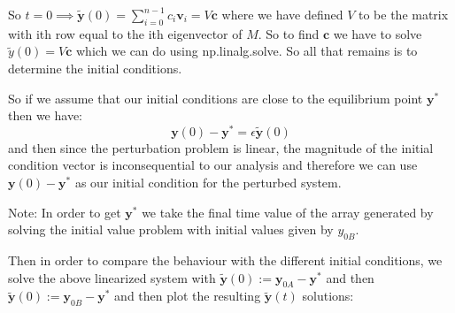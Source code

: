 \documentclass[a4paper, oneside]{book}
\begin{document}
So $t = 0 \implies \tilde{\mathbf{y}}(0) = \sum_{i=0}^{n-1} c_{i} \mathbf{v}_{i} = V \mathbf{c}$ where we have defined $V$ to be the matrix with ith row
equal to the ith eigenvector of $M$. So to find $\mathbf{c}$ we have to solve $\tilde{y}(0) = V \mathbf{c}$ which we can
do using np.linalg.solve. So all that remains is to determine the initial conditions.

So if we assume that our initial conditions are close to the equilibrium point $\mathbf{y}^*$ then we have:
$$
\mathbf{y}(0) - \mathbf{y}^* = \epsilon \tilde{\mathbf{y}}(0)
$$
and then since the perturbation problem is linear, the magnitude of the initial condition
vector is inconsequential to our analysis and therefore we can use $\mathbf{y}(0) - \mathbf{y}^*$ as our initial
condition for the perturbed system.

Note: In order to get $\mathbf{y}^*$ we take the final time value of the array generated by solving 
the initial value problem with initial values given by $y_{0B}$.

Then in order to compare the behaviour with the different initial conditions, we solve
the above linearized system with $\mathbf{\tilde{y}}(0) := \mathbf{y}_{0A} - \mathbf{y}^*$ and then $\mathbf{\tilde{y}}(0) := \mathbf{y}_{0B} - \mathbf{y}^*$ and then plot
the resulting $\mathbf{\tilde{y}}(t)$ solutions:
\end{document}
